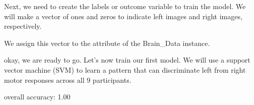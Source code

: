 \documentclass[letterpaper,10pt,english]{sphinxmanual}
\begin{document}
Next, we need to create the labels or outcome variable to train the model. We will make a vector of ones and zeros to indicate left images and right images, respectively.

We assign this vector to the  attribute of the Brain\_Data instance.

\begin{sphinxVerbatim}[commandchars=\\\{\}]
  \PYG{p}{[} \PYG{p}{]}

  
\end{sphinxVerbatim}

okay, we are ready to go. Let’s now train our first model. We will use a support vector machine (SVM) to learn a pattern that can discriminate left from right motor responses across all 9 participants.

\begin{sphinxVerbatim}[commandchars=\\\{\}]
   
\end{sphinxVerbatim}

\begin{sphinxVerbatim}[commandchars=\\\{\}]
overall accuracy: 1.00
\end{sphinxVerbatim}

\noindent{}
\end{document}
